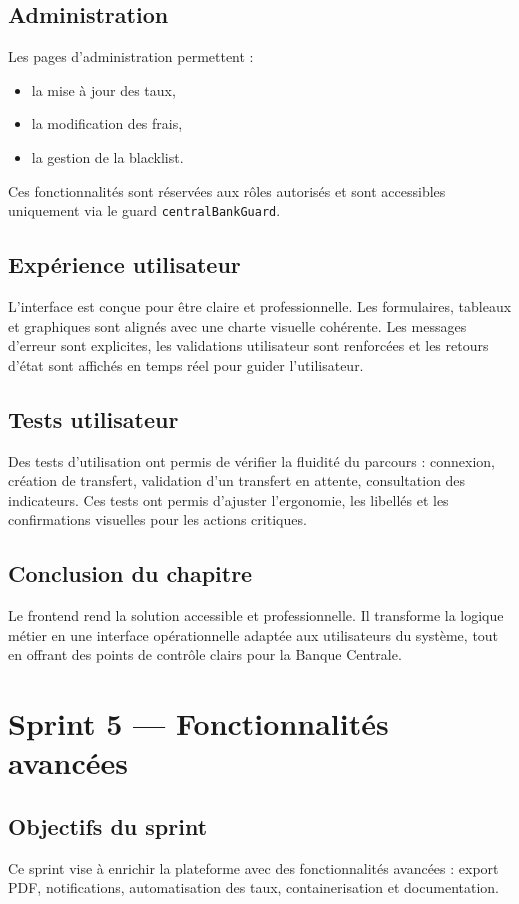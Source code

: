 \documentclass[a4paper,12pt]{report}
\begin{document}
\section{Administration}
Les pages d'administration permettent :
\begin{itemize}[leftmargin=*,nosep]
  \item la mise à jour des taux,
  \item la modification des frais,
  \item la gestion de la blacklist.
\end{itemize}
Ces fonctionnalités sont réservées aux rôles autorisés et sont accessibles uniquement via le guard \texttt{centralBankGuard}.

\section{Expérience utilisateur}
L'interface est conçue pour être claire et professionnelle. Les formulaires, tableaux et graphiques sont alignés avec une charte visuelle cohérente. Les messages d'erreur sont explicites, les validations utilisateur sont renforcées et les retours d'état sont affichés en temps réel pour guider l'utilisateur.

\section{Tests utilisateur}
Des tests d'utilisation ont permis de vérifier la fluidité du parcours : connexion, création de transfert, validation d'un transfert en attente, consultation des indicateurs. Ces tests ont permis d'ajuster l'ergonomie, les libellés et les confirmations visuelles pour les actions critiques.

\section{Conclusion du chapitre}
Le frontend rend la solution accessible et professionnelle. Il transforme la logique métier en une interface opérationnelle adaptée aux utilisateurs du système, tout en offrant des points de contrôle clairs pour la Banque Centrale.

\chapter{Sprint 5 --- Fonctionnalités avancées}
\section{Objectifs du sprint}
Ce sprint vise à enrichir la plateforme avec des fonctionnalités avancées : export PDF, notifications, automatisation des taux, containerisation et documentation.
\end{document}
